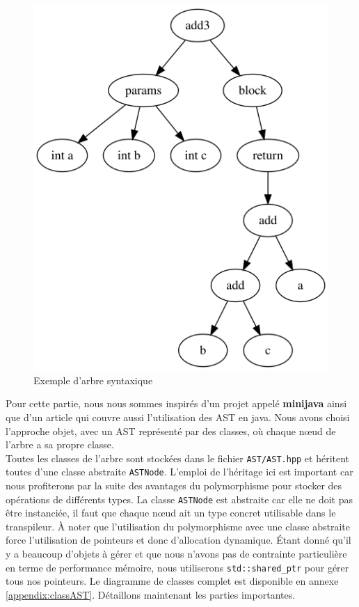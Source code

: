 \documentclass[a4paper]{article}%
\begin{document}
\begin{figure}[h]
  \begin{center}
  \includegraphics[scale=0.4]{img/ast1.png}
  \caption{Exemple d'arbre syntaxique}
  \end{center}
\end{figure}

Pour cette partie, nous nous sommes inspirés d'un projet appelé \textbf{minijava}
\cite{minijava} ainsi que d'un article \cite{gagnon1998sablecc} qui couvre aussi
l'utilisation des AST en java. Nous avons choisi l'approche objet, avec un AST
représenté par des classes, où chaque nœud de l'arbre a sa propre classe.\\

Toutes les classes de l'arbre sont stockées dans le fichier
\lstinline{AST/AST.hpp} et héritent toutes d'une classe abstraite
\lstinline{ASTNode}. L'emploi de l'héritage ici est important car
nous profiterons par la suite des avantages du polymorphisme pour stocker des
opérations de différents types. La classe \lstinline{ASTNode} est abstraite car
elle ne doit pas être instanciée, il faut que chaque nœud ait un type concret
utilisable dans le transpileur. À noter que l'utilisation du polymorphisme
avec une classe abstraite force l'utilisation de pointeurs et donc d'allocation
dynamique. Étant donné qu'il y a beaucoup d'objets à gérer et que nous n'avons
pas de contrainte particulière en terme de performance mémoire, nous utiliserons
\lstinline{std::shared_ptr} pour gérer tous nos pointeurs. Le diagramme de
classes complet est disponible en annexe \ref{appendix:classAST}. Détaillons
maintenant les parties importantes.
\end{document}
